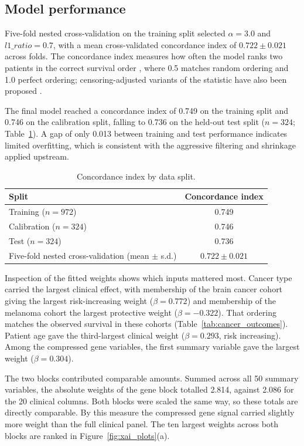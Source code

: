 \documentclass[10pt,a4paper]{article}
\begin{document}
\subsection{Model performance}

Five-fold nested cross-validation on the training split selected $\alpha = 3.0$ and
$l1\_ratio = 0.7$, with a mean cross-validated concordance index of
$0.722 \pm 0.021$ across folds. The concordance index measures how often the model
ranks two patients in the correct survival order \citep{harrell1982evaluating},
where 0.5 matches random ordering and 1.0 perfect ordering; censoring-adjusted
variants of the statistic have also been proposed \citep{uno2011c}.

The final model reached a concordance index of 0.749 on the training split and
0.746 on the calibration split, falling to 0.736 on the held-out test split
($n = 324$; Table~\ref{tab:cindex}). A gap of only 0.013 between training and test
performance indicates limited overfitting, which is consistent with the aggressive
filtering and shrinkage applied upstream.

\begin{table}[!htbp]
\centering
\caption{Concordance index by data split.}
\label{tab:cindex}
\begin{tabular}{lc}
\toprule
Split & Concordance index \\
\midrule
Training ($n = 972$) & 0.749 \\
Calibration ($n = 324$) & 0.746 \\
Test ($n = 324$) & 0.736 \\
Five-fold nested cross-validation (mean $\pm$ s.d.) & $0.722 \pm 0.021$ \\
\bottomrule
\end{tabular}
\end{table}

Inspection of the fitted weights shows which inputs mattered most. Cancer type
carried the largest clinical effect, with membership of the brain cancer cohort
giving the largest risk-increasing weight ($\beta = 0.772$) and membership of the
melanoma cohort the largest protective weight ($\beta = -0.322$). That ordering
matches the observed survival in these cohorts
(Table~\ref{tab:cancer_outcomes}). Patient age gave the third-largest clinical
weight ($\beta = 0.293$, risk increasing). Among the compressed gene variables, the
first summary variable gave the largest weight ($\beta = 0.304$).

The two blocks contributed comparable amounts. Summed across all 50 summary
variables, the absolute weights of the gene block totalled 2.814, against 2.086 for
the 20 clinical columns. Both blocks were scaled the same way, so these totals are
directly comparable. By this measure the compressed gene signal carried slightly
more weight than the full clinical panel. The ten largest weights across both
blocks are ranked in Figure~\ref{fig:xai_plots}(a).
\end{document}
